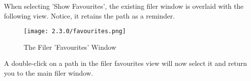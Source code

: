 
   When selecting 'Show Favourites', the existing filer window
   is overlaid with the
   following view. Notice, it retains the path as a reminder.

   \begin{figure}[H]
      \centering
      \texttt{[image: 2.3.0/favourites.png]}
      \caption{The Filer 'Favourites' Window}
      \label{fig:filer_favourites_window}
   \end{figure}

   A double-click on a path in the filer favourites view will now select it and
   return you to the main filer window.

